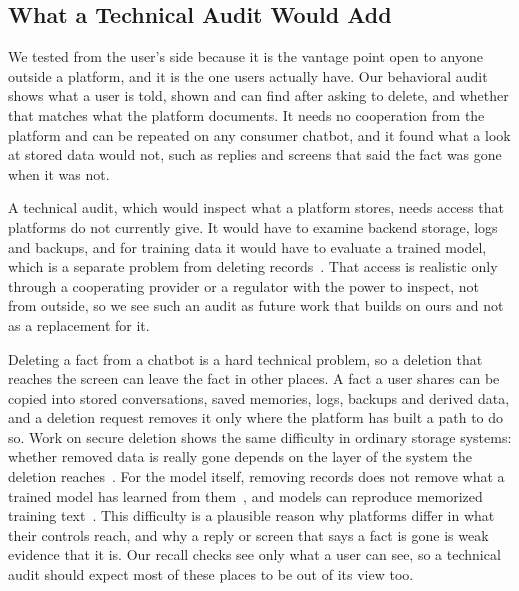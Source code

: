 \documentclass[conference,compsoc]{IEEEtran}
\begin{document}
\subsection{What a Technical Audit Would Add}
\label{sec:discussion-technical-audit}
We tested from the user's side because it is the vantage point open to anyone outside a platform, and it is the one users actually have.
Our behavioral audit shows what a user is told, shown and can find after asking to delete, and whether that matches what the platform documents.
It needs no cooperation from the platform and can be repeated on any consumer chatbot, and it found what a look at stored data would not, such as replies and screens that said the fact was gone when it was not.

A technical audit, which would inspect what a platform stores, needs access that platforms do not currently give.
It would have to examine backend storage, logs and backups, and for training data it would have to evaluate a trained model, which is a separate problem from deleting records~\cite{bourtoule2021machine}.
That access is realistic only through a cooperating provider or a regulator with the power to inspect, not from outside, so we see such an audit as future work that builds on ours and not as a replacement for it.

Deleting a fact from a chatbot is a hard technical problem, so a deletion that reaches the screen can leave the fact in other places.
A fact a user shares can be copied into stored conversations, saved memories, logs, backups and derived data, and a deletion request removes it only where the platform has built a path to do so.
Work on secure deletion shows the same difficulty in ordinary storage systems: whether removed data is really gone depends on the layer of the system the deletion reaches~\cite{reardon2013sok}.
For the model itself, removing records does not remove what a trained model has learned from them~\cite{bourtoule2021machine}, and models can reproduce memorized training text~\cite{carlini2021extracting}.
This difficulty is a plausible reason why platforms differ in what their controls reach, and why a reply or screen that says a fact is gone is weak evidence that it is.
Our recall checks see only what a user can see, so a technical audit should expect most of these places to be out of its view too.
\end{document}
